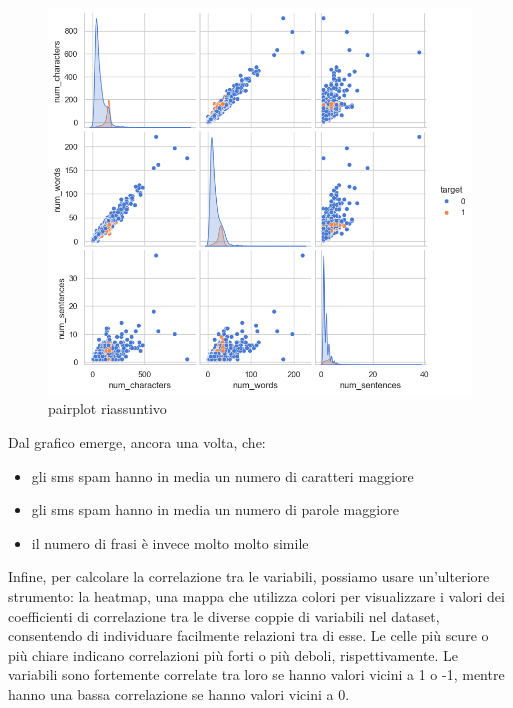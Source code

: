 \documentclass[]{article}
\begin{document}
        \begin{figure}[H]
            \centering
            \includegraphics[width=1\linewidth]{images/sns_riassuntivo.png}
            \caption{pairplot riassuntivo}
            \label{fig:enter-label}
        \end{figure}

        Dal grafico emerge, ancora una volta, che:
        \begin{itemize}
        \item gli sms spam hanno in media un numero di caratteri maggiore
        \item gli sms spam hanno in media un numero di parole maggiore
        \item il numero di frasi è invece molto molto simile
    \end{itemize}

     Infine, per calcolare la correlazione tra le variabili, possiamo usare un'ulteriore strumento: la heatmap, una mappa che utilizza colori per visualizzare i valori dei coefficienti di correlazione tra le diverse coppie di variabili nel dataset, consentendo di individuare facilmente relazioni tra di esse. Le celle più scure o più chiare indicano correlazioni più forti o più deboli, rispettivamente. Le variabili sono fortemente correlate tra loro se hanno valori vicini a 1 o -1, mentre hanno una bassa correlazione se hanno valori vicini a 0.
\end{document}
